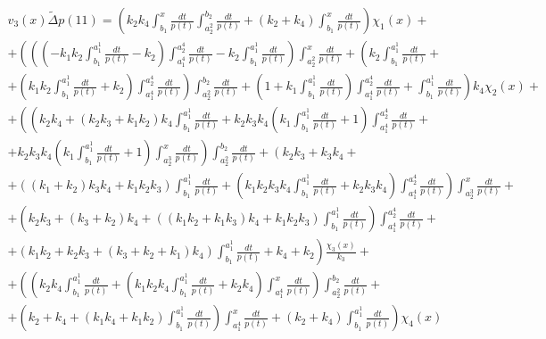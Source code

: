 \documentclass[a4paper,12pt]{article} %
\begin{document}
\begin{multline}
	{v_3(x)}{\tilde{\Delta}}p(11)=
	\left(
		k_2 k_4 \int_{b_1}^{x}\frac{dt}{p(t)} \int_{a_2^2}^{b_2}\frac{dt}{p(t)}+\left( k_2+k_4\right)  \int_{b_1}^{x}\frac{dt}{p(t)}
	\right)\chi_1(x)
	+\\+
	\left(
		\left( \left( -k_1 k_2 \int_{b_1}^{a_1^1}\frac{dt}{p(t)}-k_2\right)  \int_{a_1^4}^{a_2^4}\frac{dt}{p(t)}-k_2 \int_{b_1}^{a_1^1}\frac{dt}{p(t)}\right)  \int_{a_2^2}^{x}\frac{dt}{p(t)}+\left( k_2 \int_{b_1}^{a_1^1}\frac{dt}{p(t)}
		\right.\right. +\\+ \left.\left.
		\left( k_1 k_2 \int_{b_1}^{a_1^1}\frac{dt}{p(t)}+k_2\right)  \int_{a_1^4}^{a_2^4}\frac{dt}{p(t)}\right)  \int_{a_2^2}^{b_2}\frac{dt}{p(t)}+\left( 1+k_1 \int_{b_1}^{a_1^1}\frac{dt}{p(t)}\right)  \int_{a_1^4}^{a_2^4}\frac{dt}{p(t)}+\int_{b_1}^{a_1^1}\frac{dt}{p(t)}
	\right)k_4\chi_2(x)
	+\\+
	\left(
		\left(
			k_2 k_4+\left( k_2 k_3+k_1 k_2\right)  k_4 \int_{b_1}^{a_1^1}\frac{dt}{p(t)}+
			k_2 k_3 k_4 \left( k_1 \int_{b_1}^{a_1^1}\frac{dt}{p(t)}+1\right) \int_{a_1^4}^{a_2^4}\frac{dt}{p(t)}
			\right.\right. +\\+ \left.\left.
			k_2 k_3 k_4 \left( k_1 \int_{b_1}^{a_1^1}\frac{dt}{p(t)}+1\right) \int_{a_2^3}^{x}\frac{dt}{p(t)}
		\right)
		\int_{a_2^2}^{b_2}\frac{dt}{p(t)}+\left( k_2 k_3+k_3 k_4
		\right.\right. +\\+ \left.\left.
		\left( \left( k_1+k_2\right)  k_3 k_4+k_1 k_2 k_3\right)  \int_{b_1}^{a_1^1}\frac{dt}{p(t)}+\left( k_1 k_2 k_3 k_4 \int_{b_1}^{a_1^1}\frac{dt}{p(t)}+k_2 k_3 k_4\right)  \int_{a_1^4}^{a_2^4}\frac{dt}{p(t)}\right)  \int_{a_2^3}^{x}\frac{dt}{p(t)}
		\right. +\\+ \left.
		\left( k_2 k_3+\left( k_3+k_2\right)  k_4+\left( \left( k_1 k_2+k_1 k_3\right)  k_4+k_1 k_2 k_3\right)  \int_{b_1}^{a_1^1}\frac{dt}{p(t)}\right)  \int_{a_1^4}^{a_2^4}\frac{dt}{p(t)}
		\right. +\\+ \left.
		\left( k_1 k_2+k_2 k_3+\left( k_3+k_2+k_1\right)  k_4\right)  \int_{b_1}^{a_1^1}\frac{dt}{p(t)}+k_4+k_2
	\right)\frac{\chi_3(x)}{k_3}
	+\\+
	\left(
		\left( k_2 k_4 \int_{b_1}^{a_1^1}\frac{dt}{p(t)}+\left( k_1 k_2 k_4 \int_{b_1}^{a_1^1}\frac{dt}{p(t)}+k_2 k_4\right)  \int_{a_1^4}^{x}\frac{dt}{p(t)}\right)  \int_{a_2^2}^{b_2}\frac{dt}{p(t)}
		\right. +\\+ \left.
		\left( k_2+k_4+\left( k_1 k_4+k_1 k_2\right)  \int_{b_1}^{a_1^1}\frac{dt}{p(t)}\right)  \int_{a_1^4}^{x}\frac{dt}{p(t)}+\left( k_2+k_4\right)  \int_{b_1}^{a_1^1}\frac{dt}{p(t)}
	\right)\chi_4(x)
\end{multline}
\end{document}
